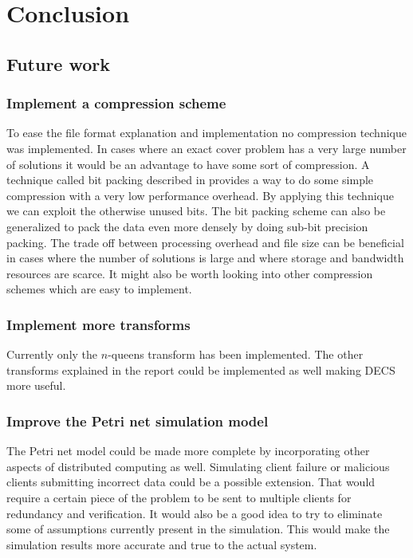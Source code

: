 
\chapter{Conclusion}
\label{conclusion}




\section{Future work}

\subsection*{Implement a compression scheme}

To ease the file format explanation and implementation no compression technique was implemented.
In cases where an exact cover problem has a very large number of solutions it would be an advantage to have some sort of compression.
A technique called bit packing described in \cite{gdip_bitpack, gpg_bitpack} provides a way to do some simple compression with a very low performance overhead.
By applying this technique we can exploit the otherwise unused bits.
The bit packing scheme can also be generalized to pack the data even more densely by doing sub-bit precision packing.
The trade off between processing overhead and file size can be beneficial in cases where the number of solutions is large and where storage and bandwidth resources are scarce.
It might also be worth looking into other compression schemes which are easy to implement.


\subsection*{Implement more transforms}

Currently only the $n$-queens transform has been implemented.
The other transforms explained in the report could be implemented as well making DECS more useful.


\subsection*{Improve the Petri net simulation model}

The Petri net model could be made more complete by incorporating other aspects of distributed computing as well.
Simulating client failure or malicious clients submitting incorrect data could be a possible extension.
That would require a certain piece of the problem to be sent to multiple clients for redundancy and verification.
It would also be a good idea to try to eliminate some of assumptions currently present in the simulation.
This would make the simulation results more accurate and true to the actual system.






